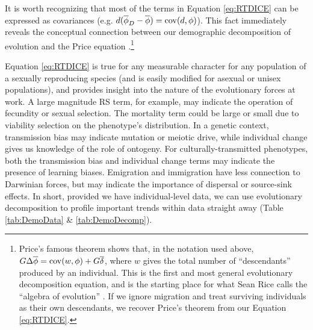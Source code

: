It is worth recognizing that most of the terms in Equation \ref{eq:RTDICE} can be expressed as covariances (e.g. $d(\overline{\phi}_D - \overline{\phi}) = \operatorname{cov}(d,\phi)$).  This fact immediately reveals the conceptual connection between our demographic decomposition of evolution and the Price equation \citep{price1970selection}.\footnote{Price's famous theorem shows that, in the notation used above, $G \Delta \overline{\phi} = \operatorname{cov}(w, \phi) + G\overline{\delta}$, where $w$ gives the total number of ``descendants'' produced by an individual.  This is the first and most general evolutionary decomposition equation, and is the starting place for what Sean Rice calls the ``algebra of evolution'' \citep{rice2004evolutionary}. If we ignore migration and treat surviving individuals as their own descendants, we recover Price's theorem from our Equation \ref{eq:RTDICE}.}

Equation \ref{eq:RTDICE} is true for any measurable character for any population of a sexually reproducing species (and is easily modified for asexual or unisex populations), and provides insight into the nature of the evolutionary forces at work.  A large magnitude RS term, for example, may indicate the operation of fecundity or sexual selection.  The mortality term could be large or small due to viability selection on the phenotype's distribution.  In a genetic context, transmission bias may indicate mutation or meiotic drive, while individual change gives us knowledge of the role of ontogeny.  For culturally-transmitted phenotypes, both the transmission bias and individual change terms may indicate the presence of learning biases.  Emigration and immigration have less connection to Darwinian forces, but may indicate the importance of dispersal or source-sink effects.  In short, provided we have individual-level data, we can use evolutionary decomposition to profile important trends within data straight away (Table \ref{tab:DemoData} \& \ref{tab:DemoDecomp}).  

